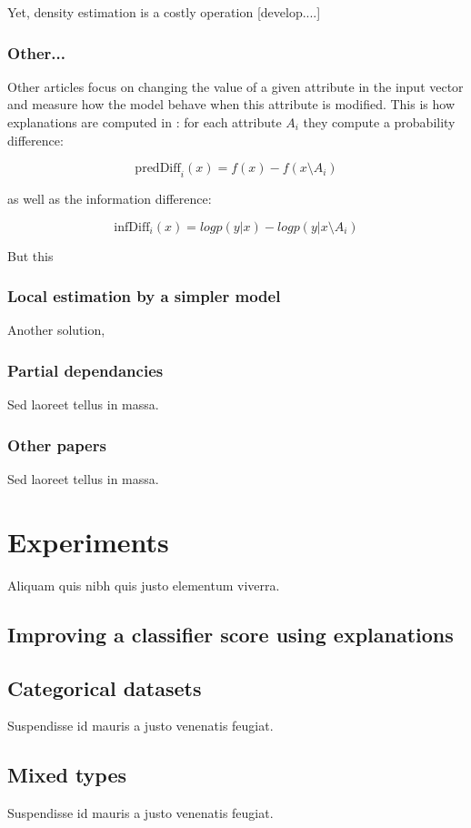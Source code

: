 \documentclass[a4paper,11pt]{kth-mag}
\begin{document}
Yet, density estimation is a costly operation [develop....]

\subsection{Other...}

Other articles focus on changing the value of a given attribute in the input vector and measure how the model behave when this attribute is modified. This is how explanations are computed in  \cite{explainingclassif}: for each attribute $A_i$ they compute a probability difference:

\[
	\mathrm{predDiff}_i(x) = f(x) - f(x \setminus A_i)
\]

as well as the information difference:

\[
	\mathrm{infDiff}_i(x) = log p(y | x) - log p(y | x \setminus A_i)
\] 

But this 

\subsection{Local estimation by a simpler model}

Another solution, 

\subsection{Partial dependancies}
Sed laoreet tellus in massa.

\subsection{Other papers}
Sed laoreet tellus in massa.


\chapter{Experiments}
Aliquam quis nibh quis justo elementum viverra.

\section{Improving a classifier score using explanations}



\section{Categorical datasets}
Suspendisse id mauris a justo venenatis feugiat.

\section{Mixed types}
Suspendisse id mauris a justo venenatis feugiat.

\nocite{mythos}
\nocite{euregulation}
\nocite{healthcare}
\nocite{trust}
\nocite{explainingclassif}
\nocite{evolutionnary}
\nocite{breastcancer}
\nocite{sensitivity}

\printbibliography
\end{document}
